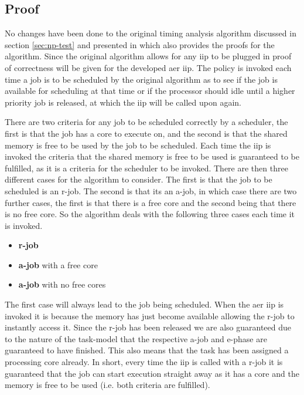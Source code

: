 \documentclass{kththesis}
\begin{document}
\subsection{Proof}

No changes have been done to the original timing analysis algorithm discussed in section
\ref{sec:np-test} and presented in \parencite{nasri_exact_2017} which also provides the proofs for
the algorithm. Since the original algorithm allows for any \acrshort{iip} to be plugged in proof of
correctness will be given for the developed \acrshort{aer} \acrshort{iip}. The policy is invoked
each time a job is to be scheduled by the original algorithm as to see if the job is available for
scheduling at that time or if the processor should idle until a higher priority job is released,
at which the \acrshort{iip} will be called upon again.

%
%



There are two criteria for any job to be scheduled correctly by a scheduler, the first is that the
job has a core to execute on, and the second is that the shared memory is free to be used by the job
to be scheduled. Each time the \acrshort{iip} is invoked the criteria that the shared memory is free
to be used is guaranteed to be fulfilled, as it is a criteria for the scheduler to be invoked. There
are then three different cases for the algorithm to consider. The first is that the job to be
scheduled is an \acrshort{r}-job. The second is that its an \acrshort{a}-job, in which case there
are two further cases, the first is that there is a free core and the second being that there is no
free core. So the algorithm deals with the following three cases each time it is invoked.

\begin {itemize}
    \item \textbf{\acrshort{r}-job}
    \item \textbf{\acrshort{a}-job} with a free core
    \item \textbf{\acrshort{a}-job} with no free cores
\end {itemize}

The first case will always lead to the job being scheduled. When the \acrshort{aer} \acrshort{iip}
is invoked it is because the memory has just become available allowing the \acrshort{r}-job to
instantly access it. Since the \acrshort{r}-job has been released we are also guaranteed due to the
nature of the task-model that the respective \acrshort{a}-job and \acrshort{e}-phase are guaranteed
to have finished. This also means that the task has been assigned a processing core already. In
short, every time the \acrshort{iip} is called with a \acrshort{r}-job it is guaranteed that the job
can start execution straight away as it has a core and the memory is free to be used (i.e. both
criteria are fulfilled). 
\end{document}
